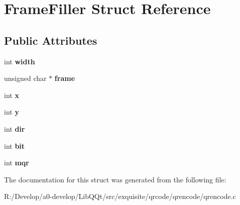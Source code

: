 \hypertarget{struct_frame_filler}{}\section{Frame\+Filler Struct Reference}
\label{struct_frame_filler}
\subsection*{Public Attributes}
\begin{DoxyCompactItemize}
\item 
\mbox{\label{struct_frame_filler_ae40fbdfcfd12acd318c0983bae112a41}} 
int {\bfseries width}
\item 
\mbox{\label{struct_frame_filler_af62dd5268e5d105eb0b8c5eee478d84a}} 
unsigned char $\ast$ {\bfseries frame}
\item 
\mbox{\label{struct_frame_filler_a1c88e4707a8f31367dc10917b423e88c}} 
int {\bfseries x}
\item 
\mbox{\label{struct_frame_filler_a40b9439e9c0cd149785944dd9c695481}} 
int {\bfseries y}
\item 
\mbox{\label{struct_frame_filler_ad497b0999a8574bfbff501d68c893534}} 
int {\bfseries dir}
\item 
\mbox{\label{struct_frame_filler_abf2006539482b99bbf47cbba183bd0ff}} 
int {\bfseries bit}
\item 
\mbox{\label{struct_frame_filler_a685d12fe521489f1f228119c00ecd9b4}} 
int {\bfseries mqr}
\end{DoxyCompactItemize}


The documentation for this struct was generated from the following file\+:\begin{DoxyCompactItemize}
\item 
R\+:/\+Develop/a0-\/develop/\+Lib\+Q\+Qt/src/exquisite/qrcode/qrencode/qrencode.\+c\end{DoxyCompactItemize}
